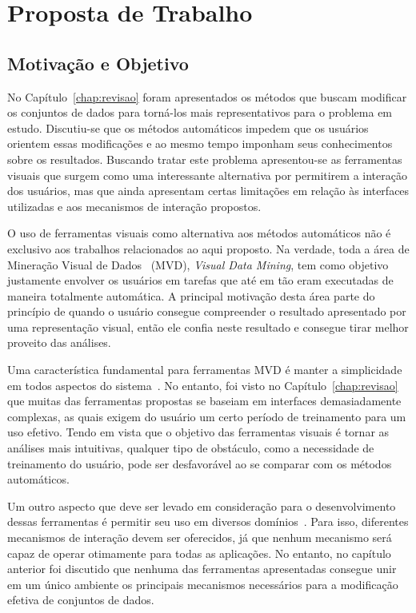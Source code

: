 \chapter{Proposta de Trabalho}\label{chap:proposta}

\section{Motivação e Objetivo}

No Capítulo~\ref{chap:revisao} foram apresentados os
métodos que buscam modificar os conjuntos de dados para 
torná-los mais representativos para o problema em estudo. 
Discutiu-se que os métodos automáticos impedem que os
usuários orientem essas modificações e ao mesmo tempo
imponham seus conhecimentos sobre os resultados. 
Buscando tratar este problema apresentou-se as ferramentas 
visuais que surgem como uma interessante alternativa
por permitirem a interação dos usuários, mas que ainda
apresentam certas limitações em relação às interfaces
utilizadas e aos mecanismos de interação propostos.

O uso de ferramentas visuais como alternativa aos métodos
automáticos não é exclusivo aos trabalhos relacionados
ao aqui proposto. Na verdade, toda a área de
Mineração Visual de Dados~\cite{Wong1999} (MVD),
\emph{Visual Data Mining}, tem como objetivo justamente
envolver os usuários em tarefas que até em tão eram
executadas de maneira totalmente automática. A principal
motivação desta área parte do princípio de quando o usuário
consegue compreender o resultado apresentado por uma
representação visual, então ele confia neste resultado e
consegue tirar melhor proveito das análises.

Uma característica fundamental para ferramentas MVD é manter
a simplicidade em todos aspectos do sistema~\cite{Wong1999}.
No entanto, foi visto no Capítulo~\ref{chap:revisao} que
muitas das ferramentas propostas se baseiam em interfaces
demasiadamente complexas, as quais exigem do usuário um
certo período de treinamento para um uso efetivo. Tendo em
vista que o objetivo das ferramentas visuais é tornar as
análises mais intuitivas, qualquer tipo de obstáculo, como a
necessidade de treinamento do usuário, pode ser desfavorável
ao se comparar com os métodos automáticos.

Um outro aspecto que deve ser levado em consideração para o
desenvolvimento dessas ferramentas é permitir seu uso em
diversos domínios~\cite{Wong1999}. Para isso, diferentes
mecanismos de interação devem ser oferecidos, já que nenhum
mecanismo será capaz de operar otimamente para todas as
aplicações. No entanto, no capítulo anterior foi discutido
que nenhuma das ferramentas apresentadas consegue unir em um
único ambiente os principais mecanismos necessários para a
modificação efetiva de conjuntos de dados.

